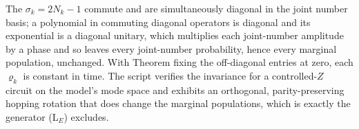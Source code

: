 The $\sigma_k = 2N_k - 1$ commute and are simultaneously diagonal in the joint number basis; a polynomial in commuting diagonal operators is diagonal and its exponential is a diagonal unitary, which multiplies each joint-number amplitude by a phase and so leaves every joint-number probability, hence every marginal population, unchanged. With Theorem  fixing the off-diagonal entries at zero, each $\varrho_k$ is constant in time. The script verifies the invariance for a controlled-$Z$ circuit on the model's mode space and exhibits an orthogonal, parity-preserving hopping rotation that does change the marginal populations, which is exactly the generator (L$_E$) excludes.
